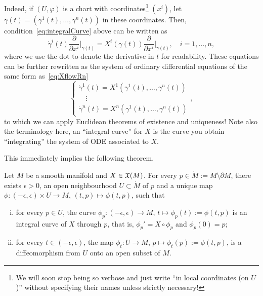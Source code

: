 Indeed, if $(U, \varphi)$ is a chart with coordinates\footnote{We will soon stop being so verbose and just write ``in local coordinates (on $U$)'' without specifying their names unless strictly necessary!} $(x^i)$, let $\gamma(t) = (\gamma^1(t), \ldots, \gamma^n(t))$ in these coordinates. Then, condition~\eqref{eq:integralCurve} above can be written as
\begin{equation}
	\dot\gamma^i(t)\frac{\partial}{\partial x^i}\Big|_{\gamma(t)}
	= X^i(\gamma(t))\frac{\partial}{\partial x^i}\Big|_{\gamma(t)},\quad i=1,\ldots,n,
\end{equation}
where we use the dot to denote the derivative in $t$ for readability.
These equations can be further rewritten as the system of ordinary differential equations of the same form as~\eqref{eq:XflowRn}
\begin{equation}
	\begin{cases}
		\dot\gamma^1(t) = X^1(\gamma^1(t), \ldots, \gamma^n(t)) \\
		\quad \vdots                                            \\
		\dot\gamma^n(t) = X^n(\gamma^1(t), \ldots, \gamma^n(t))
	\end{cases},
\end{equation}
to which we can apply Euclidean theorems of existence and uniqueness!
Note also the terminology here, an ``integral curve'' for $X$ is the curve you obtain ``integrating'' the system of ODE associated to $X$.

This immediately implies the following theorem.

\begin{theorem} %
	\label{thm:exuniqloc}
	Let $M$ be a smooth manifold and $X\in\mathfrak{X}(M)$. For every $p\in \mathring M := M\setminus \partial M$, there exists $\epsilon > 0$, an open neighbourhood $U\subset\mathring M$ of $p$ and a unique map $\phi : (-\epsilon, \epsilon) \times U \to M$, $(t, p) \mapsto \phi(t,p)$, such that
	\begin{enumerate}[(i)]
		\item for every $p\in U$, the curve $\phi_p : (-\epsilon, \epsilon) \to M$, $t\mapsto \phi_p(t) := \phi(t, p)$ is an integral curve of $X$ through $p$, that is, $\phi_p' = X\circ\phi_p$ and $\phi_p(0) = p$;
		\item for every $t\in(-\epsilon, \epsilon)$, the map $\phi_t: U \to M$, $p\mapsto \phi_t(p):=\phi(t,p)$, is a diffeomorphism from $U$ onto an open subset of $M$.
	\end{enumerate}
\end{theorem}

